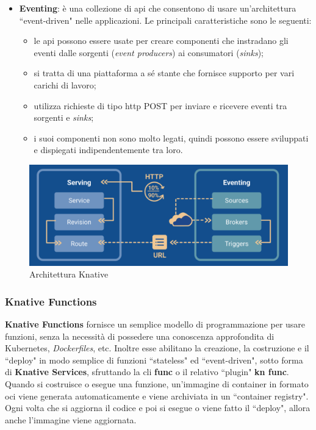 \documentclass[12pt,a4paper,openany,twoside]{book}
\begin{document}
\begin{itemize}
    \item \textbf{Eventing}: è una collezione di \ac{api} che consentono di usare un'architettura ``event-driven" nelle applicazioni.
    Le principali caratteristiche sono le seguenti:
    \begin{itemize}
        \item le \ac{api} possono essere usate per creare componenti che instradano gli eventi dalle sorgenti (\textit{event producers}) ai consumatori (\textit{sinks});
        
        \item si tratta di una piattaforma a sé stante che fornisce supporto per vari carichi di lavoro;
        
        \item utilizza richieste di tipo \ac{http} POST per inviare e ricevere eventi tra sorgenti e \textit{sinks};
        
        \item i suoi componenti non sono molto legati, quindi possono essere sviluppati e dispiegati indipendentemente tra loro.
    \end{itemize}
\end{itemize}

\begin{figure}[h]
    \centering
    \includegraphics[width=\linewidth]{figures/knative_architecture.pdf}
    \caption{Architettura Knative}
    \label{fig:architettura-knative}
\end{figure}

\subsubsection{Knative Functions}

\textbf{Knative Functions} fornisce un semplice modello di programmazione per usare funzioni, senza la necessità di possedere una conoscenza approfondita di Kubernetes, \textit{Dockerfiles}, etc.
Inoltre esse abilitano la creazione, la costruzione e il ``deploy" in modo semplice di funzioni ``stateless" ed ``event-driven", sotto forma di \textbf{Knative Services}, sfruttando la \ac{cli} \textbf{func} o il relativo ``plugin" \textbf{kn func}.
Quando si costruisce o esegue una funzione, un'immagine di container in formato \ac{oci} viene generata automaticamente e viene archiviata in un ``container registry". Ogni volta che si aggiorna il codice e poi si esegue o viene fatto il ``deploy", allora anche l'immagine viene aggiornata.
\end{document}
